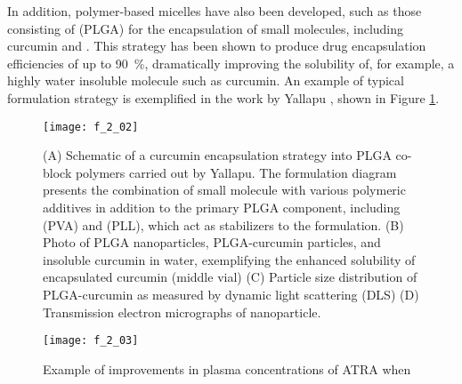 \begin{refsection}
In addition, polymer-based micelles have also been developed, such as those
consisting of  (PLGA) for the
encapsulation of small molecules, including curcumin and
.\cite{Li2009,Yallapu2010b} This strategy has
been shown to produce drug encapsulation efficiencies of up to \SI{90}{\percent},
dramatically improving the solubility of, for example, a highly water insoluble
molecule such as curcumin. An example of typical formulation strategy is
exemplified in the work by Yallapu , shown in Figure
\ref{fig:PLA_curcumin_example}.\cite{Yallapu2010b}
\begin{figure}[h!] \centering \texttt{[image: f\_2\_02]}
    \caption[(A) Schematic of a curcumin encapsulation strategy into PLGA co-block
    polymers carried out by Yallapu. The formulation diagram presents the
    combination of small molecule with various polymeric additives in addition
    to the primary PLGA component, including  (PVA) and
     (PLL), which act as stabilizers to the formulation.
    (B) Photo of PLGA nanoparticles, PLGA-curcumin particles, and insoluble
    curcumin in water, exemplifying the enhanced solubility of encapsulated
    curcumin (middle vial) (C) Particle size distribution of PLGA-curcumin as
    measured by dynamic light scattering (DLS) (D) Transmission electron
    micrographs of nanoparticle.
    ]{(A) Schematic of a curcumin encapsulation strategy into PLGA co-block
    polymers carried out by Yallapu. The formulation diagram presents the
    combination of small molecule with various polymeric additives in addition
    to the primary PLGA component, including  (PVA) and
     (PLL), which act as stabilizers to the formulation.
    (B) Photo of PLGA nanoparticles, PLGA-curcumin particles, and insoluble
    curcumin in water, exemplifying the enhanced solubility of encapsulated
    curcumin (middle vial) (C) Particle size distribution of PLGA-curcumin as
    measured by dynamic light scattering (DLS) (D) Transmission electron
    micrographs of nanoparticle.\cite{Yallapu2010b}}
    \label{fig:PLA_curcumin_example} \end{figure}
\begin{figure}[h!] \centering \texttt{[image: f\_2\_03]}
    \caption[Example of improvements in plasma concentrations of ATRA when
    encapsulated in polymeric, PEG-/PLA-based nanoparticles.]{Example of improvements in plasma concentrations of ATRA when
}
\end{figure}
\end{refsection}
